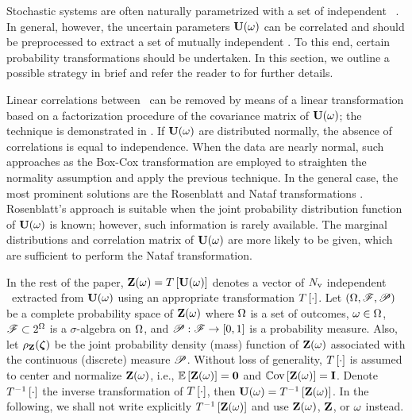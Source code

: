 Stochastic systems are often naturally parametrized with a set of independent \rvs\ \cite{xiu2010}. In general, however, the uncertain parameters $\mathbf{U}(\omega)$ can be correlated and should be preprocessed to extract a set of mutually independent \rvs. To this end, certain probability transformations should be undertaken. In this section, we outline a possible strategy in brief and refer the reader to \cite{xiu2010, eldred2009} for further details.

Linear correlations between \rvs\ can be removed by means of a linear transformation based on a factorization procedure of the covariance matrix of $\mathbf{U}(\omega)$; the technique is demonstrated in . If $\mathbf{U}(\omega)$ are distributed normally, the absence of correlations is equal to independence. When the data are nearly normal, such approaches as the Box-Cox transformation are employed to straighten the normality assumption and apply the previous technique. In the general case, the most prominent solutions are the Rosenblatt and Nataf transformations \cite{eldred2009}. Rosenblatt's approach is suitable when the joint probability distribution function of $\mathbf{U}(\omega)$ is known; however, such information is rarely available. The marginal distributions and correlation matrix of $\mathbf{U}(\omega)$ are more likely to be given, which are sufficient to perform the Nataf transformation.

In the rest of the paper, $\mathbf{Z}(\omega) = T\left[\mathbf{U}(\omega)\right]$ denotes a vector of ${N_\text{v}}$ independent \rvs\ extracted from $\mathbf{U}(\omega)$ using an appropriate transformation $T\left[\cdot\right]$. Let $(\Omega, \mathscr{F}, \mathscr{P})$ be a complete probability space \cite{durrett2010} of $\mathbf{Z}(\omega)$ where $\Omega$ is a set of outcomes, $\omega \in \Omega$, $\mathscr{F} \subset 2^\Omega$ is a $\sigma$-algebra on $\Omega$, and $\mathscr{P}: \mathscr{F} \to [0, 1]$ is a probability measure. Also, let $\rho_{\mathbf{Z}}(\boldsymbol{\zeta})$ be the joint probability density (mass) function of $\mathbf{Z}(\omega)$ associated with the continuous (discrete) measure $\mathscr{P}$. Without loss of generality, $T\left[\cdot\right]$ is assumed to center and normalize $\mathbf{Z}(\omega)$, i.e., $\oExp{\vZ(\o)} = \mZero$ and $\oCov{\vZ(\o)} = \mI$. Denote $T^{-1}\left[\cdot\right]$ the inverse transformation of $T\left[\cdot\right]$, then $\mathbf{U}(\omega) = T^{-1}\left[\mathbf{Z}(\omega)\right]$. In the following, we shall not write explicitly $T^{-1}\left[\mathbf{Z}(\omega)\right]$ and use $\mathbf{Z}(\omega)$, $\mathbf{Z}$, or $\omega$ instead.
